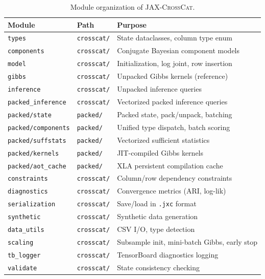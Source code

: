 \documentclass[11pt]{article}
\newcommand{\jaxcc}{\textsc{JAX-CrossCat}}
\begin{document}
\begin{table}[!htb]
\centering
\small
\caption{Module organization of \jaxcc{}.}
\label{tab:modules}
\begin{tabular}{llp{6.5cm}}
\toprule
Module & Path & Purpose \\
\midrule
\texttt{types} & \texttt{crosscat/} & State dataclasses, column type enum \\
\texttt{components} & \texttt{crosscat/} & Conjugate Bayesian component models \\
\texttt{model} & \texttt{crosscat/} & Initialization, log joint, row insertion \\
\texttt{gibbs} & \texttt{crosscat/} & Unpacked Gibbs kernels (reference) \\
\texttt{inference} & \texttt{crosscat/} & Unpacked inference queries \\
\texttt{packed\_inference} & \texttt{crosscat/} & Vectorized packed inference queries \\
\midrule
\texttt{packed/state} & \texttt{packed/} & Packed state, pack/unpack, batching \\
\texttt{packed/components} & \texttt{packed/} & Unified type dispatch, batch scoring \\
\texttt{packed/suffstats} & \texttt{packed/} & Vectorized sufficient statistics \\
\texttt{packed/kernels} & \texttt{packed/} & JIT-compiled Gibbs kernels \\
\texttt{packed/aot\_cache} & \texttt{packed/} & XLA persistent compilation cache \\
\midrule
\texttt{constraints} & \texttt{crosscat/} & Column/row dependency constraints \\
\texttt{diagnostics} & \texttt{crosscat/} & Convergence metrics (ARI, log-lik) \\
\texttt{serialization} & \texttt{crosscat/} & Save/load in \texttt{.jxc} format \\
\texttt{synthetic} & \texttt{crosscat/} & Synthetic data generation \\
\texttt{data\_utils} & \texttt{crosscat/} & CSV I/O, type detection \\
\texttt{scaling} & \texttt{crosscat/} & Subsample init, mini-batch Gibbs, early stop \\
\texttt{tb\_logger} & \texttt{crosscat/} & TensorBoard diagnostics logging \\
\texttt{validate} & \texttt{crosscat/} & State consistency checking \\
\bottomrule
\end{tabular}
\end{table}
\end{document}
